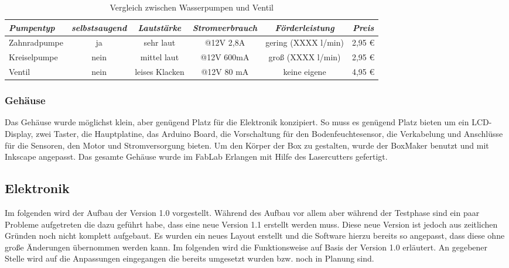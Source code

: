 \documentclass[]{IEEEtran}
\begin{document}
	\begin{table*}[!t]
	

	\begin{tabular}{|lccccc|}
	\hline
	\textit{Pumpentyp} & \textit{selbstsaugend} & \textit{Lautstärke} & \textit{Stromverbrauch} & \textit{Förderleistung} & \textit{Preis} \\ \hline
	Zahnradpumpe & ja & sehr laut & @12V 2,8A & gering (XXXX l/min)& 2,95 \euro  \\
	Kreiselpumpe & nein & mittel laut & @12V 600mA & groß (XXXX l/min)& 2,95 \euro \\
	Ventil & nein & leises Klacken & @12V 80 mA & keine eigene & 4,95 \euro \\
	\hline
	\end{tabular}
	\caption{Vergleich zwischen Wasserpumpen und Ventil}
	\label{Vergleich zwischen Wasserpumpen und Ventil}
	
\end{table*}	
	
	\subsubsection{Gehäuse}
	Das Gehäuse wurde möglichst klein, aber genügend Platz für die Elektronik konzipiert.
	So muss es genügend Platz bieten um ein LCD-Display, zwei Taster, die Hauptplatine, das Arduino Board,  die Vorschaltung für den Bodenfeuchtesensor, die Verkabelung und Anschlüsse für die Sensoren, den Motor und Stromversorgung  bieten.
	Um den Körper der Box zu gestalten, wurde der BoxMaker benutzt und mit Inkscape angepasst. 
	Das gesamte Gehäuse wurde im FabLab Erlangen mit Hilfe des Lasercutters gefertigt.
	
	\subsection{Elektronik}
	Im folgenden wird der Aufbau der Version 1.0 vorgestellt. Während des Aufbau vor allem aber während der Testphase sind ein paar Probleme aufgetreten die dazu geführt habe, dass eine neue Version 1.1 erstellt werden muss. Diese neue Version ist jedoch aus zeitlichen Gründen noch nicht komplett aufgebaut. Es wurden ein neues Layout erstellt und die Software hierzu bereits so angepasst, dass diese ohne große Änderungen übernommen werden kann. Im folgenden wird die Funktionsweise auf Basis der Version 1.0 erläutert. An gegebener Stelle wird auf die  Anpassungen eingegangen die bereits umgesetzt wurden bzw. noch in Planung sind. 
\end{document}
